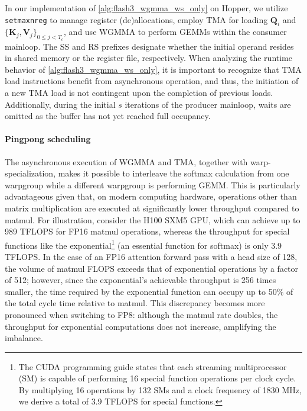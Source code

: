 \begin{enumerate}
In our implementation of \cref{alg:flash3_wgmma_ws_only} on Hopper, we utilize \verb|setmaxnreg| to manage register (de)allocations, employ TMA for loading $\mathbf{Q}_i$ and $\{ \mathbf{K}_j, \mathbf{V}_j \}_{0 \leq j < T_c}$, and use WGMMA to perform GEMMs within the consumer mainloop. The SS and RS prefixes designate whether the initial operand resides in shared memory or the register file, respectively. When analyzing the runtime behavior of \cref{alg:flash3_wgmma_ws_only}, it is important to recognize that TMA load instructions benefit from asynchronous operation, and thus, the initiation of a new TMA load is not contingent upon the completion of previous loads. Additionally, during the initial $s$ iterations of the producer mainloop, waits are omitted as the buffer has not yet reached full occupancy.

\paragraph{Pingpong scheduling} The asynchronous execution of WGMMA and TMA, together with warp-specialization, makes it possible to interleave the softmax calculation from one warpgroup while a different warpgroup is performing GEMM. This is particularly advantageous given that, on modern computing hardware, operations other than matrix multiplication are executed at significantly lower throughput compared to matmul. For illustration, consider the H100 SXM5 GPU, which can achieve up to 989 TFLOPS for FP16 matmul operations, whereas the throughput for special functions like the exponential\footnote{The CUDA programming guide states that each streaming multiprocessor (SM) is capable of performing 16 special function operations per clock cycle. By multiplying 16 operations by 132 SMs and a clock frequency of 1830 MHz, we derive a total of 3.9 TFLOPS for special functions.} (an essential function for softmax) is only 3.9 TFLOPS. In the case of an FP16 attention forward pass with a head size of 128, the volume of matmul FLOPS exceeds that of exponential operations by a factor of 512; however, since the exponential’s achievable throughput is 256 times smaller, the time required by the exponential function can occupy up to 50\% of the total cycle time relative to matmul. This discrepancy becomes more pronounced when switching to FP8: although the matmul rate doubles, the throughput for exponential computations does not increase, amplifying the imbalance.


\end{enumerate}
